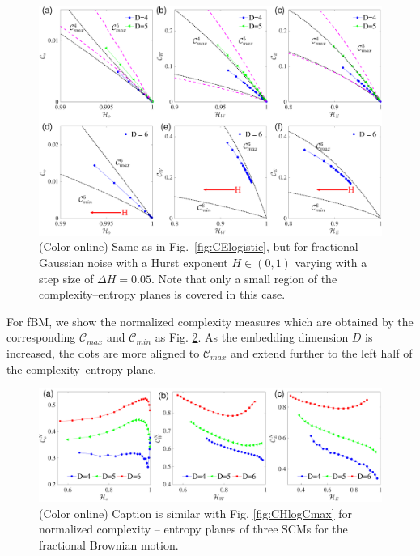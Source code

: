 \documentclass[aip,cha,reprint,nofootinbib]{revtex4-1}
\begin{document}
\begin{figure}
	\centering 
	\includegraphics[width=2\columnwidth]{CompEntropy_fGn.pdf}
\caption{\small{(Color online) Same as in Fig.~\ref{fig:CElogistic}, but for fractional Gaussian noise with a Hurst exponent $H \in (0, 1)$ varying with a step size of $\Delta H=0.05$. Note that only a small region of the complexity--entropy planes is covered in this case. }  \label{fig:CEfGn}}
\end{figure}

{\color{red} For fBM, we show the normalized complexity measures which are obtained by the corresponding $\mathcal{C}_{max}$ and $\mathcal{C}_{min}$ as Fig. \ref{fig:CHfbmCmax}. As the embedding dimension $D$ is increased, the dots are more aligned to $\mathcal{C}_{max}$ and extend further to the left half of the complexity--entropy plane. 
\begin{figure}
        \centering
        \includegraphics[width=2\columnwidth]{CompEntropyCNormalized_fBm.pdf}
\caption{(Color online) Caption is similar with Fig. \ref{fig:CHlogCmax} for normalized complexity -- entropy planes of three SCMs for the fractional Brownian motion.  \label{fig:CHfbmCmax}}
\end{figure}
}
\end{document}
